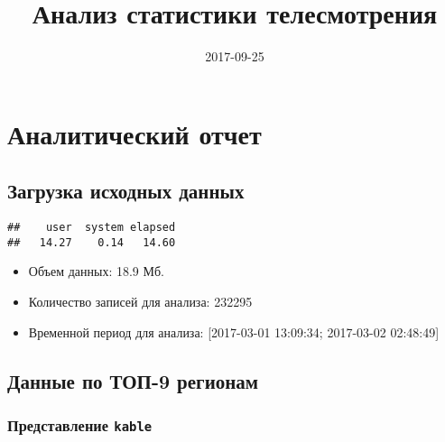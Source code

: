 \documentclass[12pt,]{article}
\title{Анализ статистики телесмотрения}
\author{}
\date{2017-09-25}
\providecommand{\tightlist}{%
  \setlength{\itemsep}{0pt}\setlength{\parskip}{0pt}}
\begin{document}
\maketitle

\section{Аналитический отчет}\label{-}

\subsection{Загрузка исходных данных}\label{--}

\begin{verbatim}
##    user  system elapsed 
##   14.27    0.14   14.60
\end{verbatim}

\begin{itemize}
\tightlist
\item
  Объем данных: 18.9 Мб.
\item
  Количество записей для анализа: 232295
\item
  Временной период для анализа: {[}2017-03-01 13:09:34; 2017-03-02
  02:48:49{]}
\end{itemize}

\subsection{Данные по ТОП-9 регионам}\label{---9-}

\subsubsection{\texorpdfstring{Представление
\texttt{kable}}{Представление kable}}\label{-kable}
\end{document}
